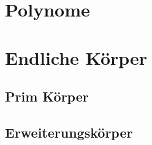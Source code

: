 \section{Polynome}
\section{Endliche Körper}
\subsection{Prim Körper}
\subsection{Erweiterungskörper}

